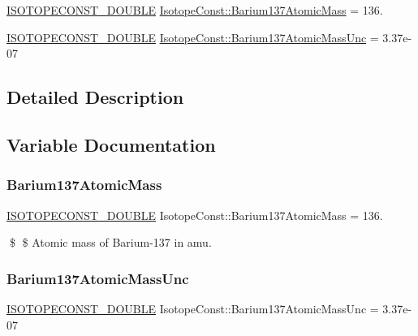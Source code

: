 \begin{DoxyCompactItemize}
\item 
\mbox{\hyperlink{group___isotope_const-_macros_ga8f45a7272ce02c0b4c65c44636ed719a}{I\+S\+O\+T\+O\+P\+E\+C\+O\+N\+S\+T\+\_\+\+D\+O\+U\+B\+LE}} \mbox{\hyperlink{group___isotope_const-_barium-_ba137_gac891c7166173d0043a4e8063f24b9615}{Isotope\+Const\+::\+Barium137\+Atomic\+Mass}} = 136.
\item 
\mbox{\hyperlink{group___isotope_const-_macros_ga8f45a7272ce02c0b4c65c44636ed719a}{I\+S\+O\+T\+O\+P\+E\+C\+O\+N\+S\+T\+\_\+\+D\+O\+U\+B\+LE}} \mbox{\hyperlink{group___isotope_const-_barium-_ba137_ga1381358c0290aa1861002ea1e36df2d2}{Isotope\+Const\+::\+Barium137\+Atomic\+Mass\+Unc}} = 3.\+37e-\/07
\end{DoxyCompactItemize}


\subsection{Detailed Description}


\subsection{Variable Documentation}
\mbox{\label{group___isotope_const-_barium-_ba137_gac891c7166173d0043a4e8063f24b9615}} 
\subsubsection{\texorpdfstring{Barium137\+Atomic\+Mass}{Barium137AtomicMass}}
{\footnotesize\ttfamily \mbox{\hyperlink{group___isotope_const-_macros_ga8f45a7272ce02c0b4c65c44636ed719a}{I\+S\+O\+T\+O\+P\+E\+C\+O\+N\+S\+T\+\_\+\+D\+O\+U\+B\+LE}} Isotope\+Const\+::\+Barium137\+Atomic\+Mass = 136.}

\$ \$ Atomic mass of Barium-\/137 in amu. \mbox{\label{group___isotope_const-_barium-_ba137_ga1381358c0290aa1861002ea1e36df2d2}} 
\subsubsection{\texorpdfstring{Barium137\+Atomic\+Mass\+Unc}{Barium137AtomicMassUnc}}
{\footnotesize\ttfamily \mbox{\hyperlink{group___isotope_const-_macros_ga8f45a7272ce02c0b4c65c44636ed719a}{I\+S\+O\+T\+O\+P\+E\+C\+O\+N\+S\+T\+\_\+\+D\+O\+U\+B\+LE}} Isotope\+Const\+::\+Barium137\+Atomic\+Mass\+Unc = 3.\+37e-\/07}

